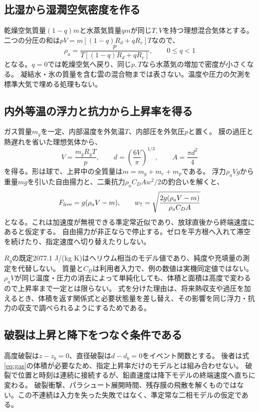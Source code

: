 \documentclass[11pt,a4paper]{article}
\newcommand{\code}[1]{\texttt{\detokenize{#1}}}
\begin{document}
\subsection{比湿から湿潤空気密度を作る}
乾燥空気質量$(1-q)m$と水蒸気質量$q m$が同じ$T,V$を持つ理想混合気体とする。
二つの分圧の和は$pV=m[(1-q)R_d+qR_v]T$なので、
\begin{equation}
 \rho_a=\frac{p}{T[(1-q)R_d+qR_v]},\qquad 0\le q<1
 \label{eq:density}
\end{equation}
となる。$q=0$では乾燥空気へ戻り、同じ$p,T$なら水蒸気の増加で密度が小さくなる。
凝結水・氷の質量を含む雲の混合物までは表さない。温度や圧力の欠測を標準大気で埋める処理もない。

\subsection{内外等温の浮力と抗力から上昇率を得る}
ガス質量$m_g$を一定、内部温度を外気温$T$、内部圧を外気圧$p$と置く。
膜の過圧と熱遅れを省いた理想気体から、
\begin{equation}
 V=\frac{m_gR_gT}{p},\qquad d=\left(\frac{6V}{\pi}\right)^{1/3},\qquad A=\frac{\pi d^2}{4}
 \label{eq:gas}
\end{equation}
を得る。形は球で、上昇中の全質量は$m=m_g+m_e+m_p$である。
浮力$\rho_a Vg$から重量$mg$を引いた自由揚力と、二乗抗力$\rho_a C_DAw^2/2$の釣合いを解くと、
\begin{equation}
 F_{\rm free}=g(\rho_a V-m),\qquad
 w_\uparrow=\sqrt{\frac{2g(\rho_a V-m)}{\rho_a C_DA}}
 \label{eq:ascent}
\end{equation}
となる。これは加速度が無視できる準定常近似であり、放球直後から終端速度にあると仮定する。
自由揚力が非正なら\code{INSUFFICIENT_LIFT}で停止する。ゼロを平方根へ入れて滞空を続けたり、指定速度へ切り替えたりしない。

$R_g$の既定2077.1 J/(kg K)はヘリウム相当のモデル値であり、純度や充填量の測定を代替しない。
質量と$C_D$は利用者入力で、例の数値は実機同定値ではない。$\rho_a V$が同じ温度・圧力の消去によって単純化しても、体積と面積は高度で変わるので上昇率まで一定とは限らない。
式を分けた理由は、将来熱収支や過圧を加えるとき、体積を返す関係式と必要状態量を差し替え、その影響を同じ浮力・抗力の収支で調べられるようにするためである。

\subsection{破裂は上昇と降下をつなぐ条件である}
高度破裂は$z-z_b=0$、直径破裂は$d-d_b=0$をイベント関数とする。
後者は式\eqref{eq:gas}の体積が必要なため、指定上昇率だけのモデルとは組み合わせない。
破裂で位置と時刻は連続に接続するが、鉛直速度は降下モデルの終端速度へ直ちに変わる。
破裂衝撃、パラシュート展開時間、残存膜の飛散を解くものではない。この不連続は入力を失った失敗ではなく、準定常な二相モデルの仮定である。
\end{document}
